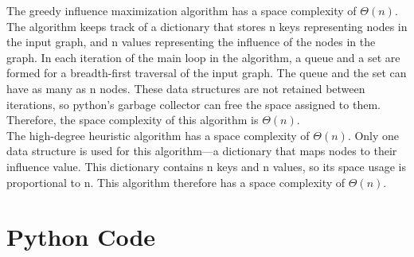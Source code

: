 \documentclass{article}
\begin{document}
The greedy influence maximization algorithm has a space complexity of $\Theta(n)$.  The algorithm keeps track of a dictionary that stores n keys representing nodes in the input graph, and n values representing the influence of the nodes in the graph.  In each iteration of the main loop in the algorithm, a queue and a set are formed for a breadth-first traversal of the input graph.  The queue and the set can have as many as n nodes.  These data structures are not retained between iterations, so python's garbage collector can free the space assigned to them.  Therefore, the space complexity of this algorithm is $\Theta(n)$. \\

The high-degree heuristic algorithm has a space complexity of $\Theta(n)$.  Only one data structure is used for this algorithm---a dictionary that maps nodes to their influence value.  This dictionary contains n keys and n values, so its space usage is proportional to n.  This algorithm therefore has a space complexity of $\Theta(n)$.


\section{Python Code}
\end{document}
